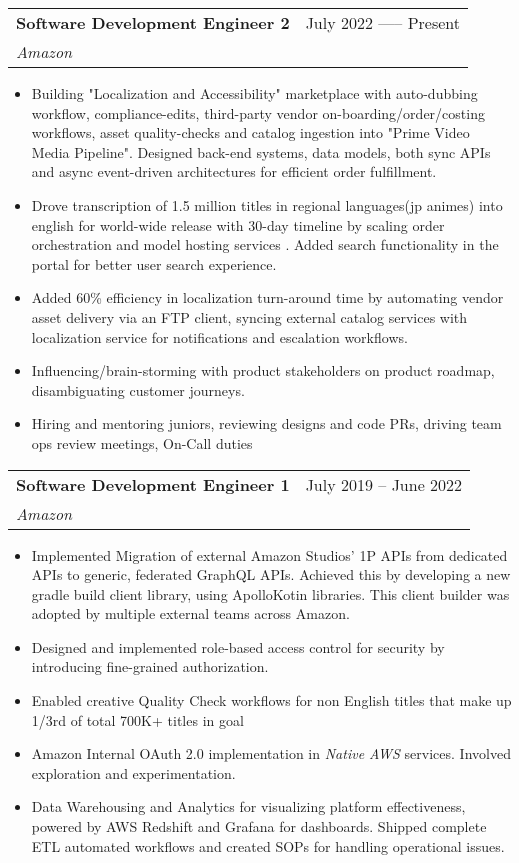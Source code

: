 \documentclass[letterpaper,11pt]{article}
\makeatletter
\newcommand{\resumeItem}[1]{
  \item\small{
    {#1 \vspace{-2pt}}
  }
}
\newcommand{\resumeSubheading}[4]{
  \vspace{-2pt}\item
    \begin{tabular*}{0.97\textwidth}[t]{l@{\extracolsep{\fill}}r}
      \textbf{#1} & #2 \\
      \textit{\small#3} & \textit{\small #4} \\
    \end{tabular*}\vspace{-7pt}
}
\newcommand{\resumeSubSubheading}[2]{
    \item
    \begin{tabular*}{0.97\textwidth}{l@{\extracolsep{\fill}}r}
      \textit{\small#1} & \textit{\small #2} \\
    \end{tabular*}\vspace{-7pt}
}
\newcommand{\resumeSubHeadingListEnd}{\end{itemize}}
\newcommand{\resumeItemListStart}{\begin{itemize}}
\newcommand{\resumeItemListEnd}{\end{itemize}\vspace{-5pt}}
\makeatother
\begin{document}
    \resumeSubheading
      {Software Development Engineer 2}{July 2022 ----- Present}
      {Amazon}{}
      \resumeItemListStart
        \resumeItem{Building "Localization and Accessibility" marketplace with auto-dubbing workflow, compliance-edits, third-party vendor on-boarding/order/costing workflows, asset quality-checks and catalog ingestion into "Prime Video Media Pipeline". Designed back-end systems, data models, both sync APIs and async event-driven architectures for efficient order fulfillment.}
        \resumeItem{Drove transcription of 1.5 million titles in regional languages(jp animes) into english for world-wide release with 30-day timeline by scaling order orchestration and model hosting services . Added search functionality in the portal for better user search experience.}
        \resumeItem{Added 60\% efficiency in localization turn-around time by automating vendor asset delivery via an FTP client, syncing external catalog services with localization service for notifications and escalation workflows.}
        \resumeItem{Influencing/brain-storming with product stakeholders on product roadmap, disambiguating customer journeys.}
        \resumeItem{Hiring and mentoring juniors, reviewing designs and code PRs, driving team ops review meetings, On-Call duties}
      \resumeItemListEnd
      

    \resumeSubheading
      {Software Development Engineer 1}{July 2019 -- June 2022}
      {Amazon}{}
      \resumeItemListStart
        \resumeItem{Implemented Migration of external Amazon Studios' 1P APIs from dedicated APIs to generic, federated GraphQL APIs. Achieved this by developing a new gradle build client library, using ApolloKotin libraries. This client builder was adopted by multiple external teams across Amazon.}
        \resumeItem{Designed and implemented role-based access control for security by introducing fine-grained authorization.}
        \resumeItem{Enabled creative Quality Check workflows for non English titles that make up 1/3rd of total 700K+ titles in goal}
        \resumeItem{Amazon Internal OAuth 2.0 implementation in \emph{Native AWS} services. Involved exploration and experimentation.}
        \resumeItem{Data Warehousing and Analytics for visualizing platform effectiveness, powered by AWS Redshift and Grafana for dashboards. Shipped complete ETL automated workflows and created SOPs for handling operational issues.}
    \resumeItemListEnd
\end{document}
